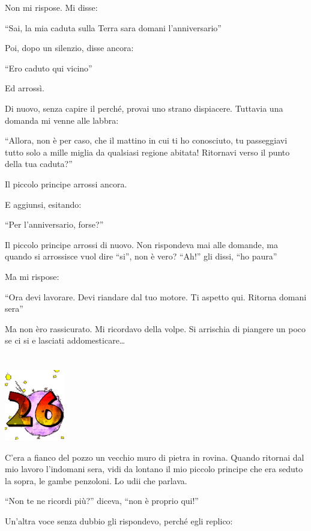 \documentclass[11pt]{scrbook}
\begin{document}
Non mi rispose. Mi disse:

``Sai, la mia caduta sulla Terra sara domani l'anniversario''

Poi, dopo un silenzio, disse ancora:

``Ero caduto qui vicino''

Ed arrossì.

Di nuovo, senza capire il perché, provai uno strano dispiacere. Tuttavia
una domanda mi venne alle labbra:

``Allora, non è per caso, che il mattino in cui ti ho conosciuto, tu
passeggiavi tutto solo a mille miglia da qualsiasi regione abitata!
Ritornavi verso il punto della tua caduta?''

Il piccolo principe arrossi ancora.

E aggiunsi, esitando:

``Per l'anniversario, forse?''

Il piccolo principe arrossi di nuovo. Non rispondeva mai alle domande,
ma quando si arrossisce vuol dire ``si'', non è vero? ``Ah!'' gli dissi,
``ho paura''

Ma mi rispose:

``Ora devi lavorare. Devi riandare dal tuo motore. Ti aspetto qui.
Ritorna domani sera''

Ma non èro rassicurato. Mi ricordavo della volpe. Si arrischia di
piangere un poco se ci si e lasciati addomesticare\ldots{}

\chapter{}
\begin{center}
\includegraphics{img/chapter26}
\end{center}

C'era a fianco del pozzo un vecchio muro di pietra in rovina. Quando
ritornai dal mio lavoro l'indomani sera, vidi da lontano il mio piccolo
principe che era seduto la sopra, le gambe penzoloni. Lo udii che
parlava.

``Non te ne ricordi più?'' diceva, ``non è proprio qui!''

Un'altra voce senza dubbio gli rispondevo, perché egli replico:
\end{document}
